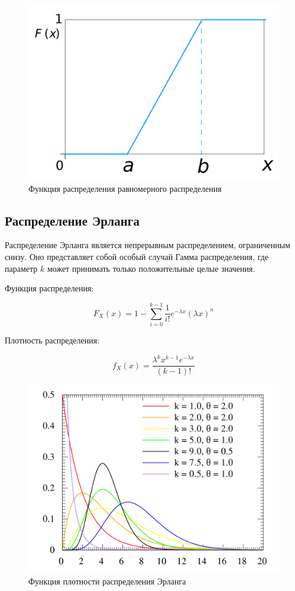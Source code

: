 \begin{figure}[H]
    \begin{center}
    \includegraphics[width=0.5\linewidth]{inc/uni_Fx.png}
    \caption{Функция распределения равномерного распределения}
    \label{fig:}
    \end{center}
\end{figure}

\subsection{Распределение Эрланга}

Распределение Эрланга является непрерывным распределением, ограниченным снизу. Оно представляет собой особый случай Гамма распределения, где параметр $k$ может принимать только положительные целые значения.

Функция распределения:

\begin{equation*}
F_X(x) = 1 - \sum_{i=0}^{k-1}  \frac{1}{i!} e^{-\lambda x} (\lambda x)^n
\end{equation*}
    
Плотность распределения:

\begin{equation*}
f_X(x) = \frac{\lambda^k x^{k-1} e^{-\lambda x} } {(k-1)!}
\end{equation*}

\begin{figure}[H]
    \begin{center}
    \includegraphics[width=0.5\linewidth]{inc/erlang_f.png}
    \caption{Функция плотности распределения Эрланга}
    \label{fig:}
    \end{center}
\end{figure}

